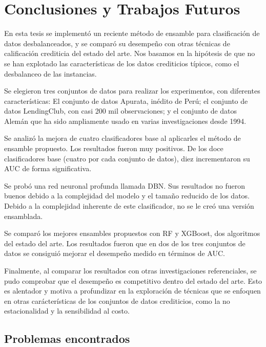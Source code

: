 \chapter{Conclusiones y Trabajos Futuros}\label{chap:conclusiones}


En esta tesis se implementó un reciente método de ensamble para clasificación de datos desbalanceados, y se comparó su desempeño con otras técnicas de calificación crediticia del estado del arte. Nos basamos en la hipótesis de que no se han explotado las características de los datos crediticios típicos, como el desbalanceo de las instancias.

Se elegieron tres conjuntos de datos para realizar los experimentos, con diferentes características: El conjunto de datos Apurata, inédito de Perú; el conjunto de datos LendingClub, con casi 200 mil observaciones; y el conjunto de datos Alemán que ha sido ampliamente usado en varias investigaciones desde 1994.

Se analizó la mejora de cuatro clasificadores base al aplicarles el método de ensamble propuesto. Los resultados fueron muy positivos. De los doce clasificadores base (cuatro por cada conjunto de datos), diez incrementaron su \ac{AUC} de forma significativa.

Se probó una red neuronal profunda llamada \ac{DBN}. Sus resultados no fueron buenos debido a la complejidad del modelo y el tamaño reducido de los datos. Debido a la complejidad inherente de este clasificador, no se le creó una versión ensamblada.

Se comparó los mejores ensambles propuestos con \ac{RF} y \ac{XGBoost}, dos algoritmos del estado del arte. Los resultados fueron que en dos de los tres conjuntos de datos se consiguió mejorar el desempeño medido en términos de \ac{AUC}.

Finalmente, al comparar los resultados con otras investigaciones referenciales, se pudo comprobar que el desempeño es competitivo dentro del estado del arte. Esto es alentador y motiva a profundizar en la exploración de técnicas que se enfoquen en otras carácterísticas de los conjuntos de datos crediticios, como la no estacionalidad y la sensibilidad al costo.


\section{Problemas encontrados}

